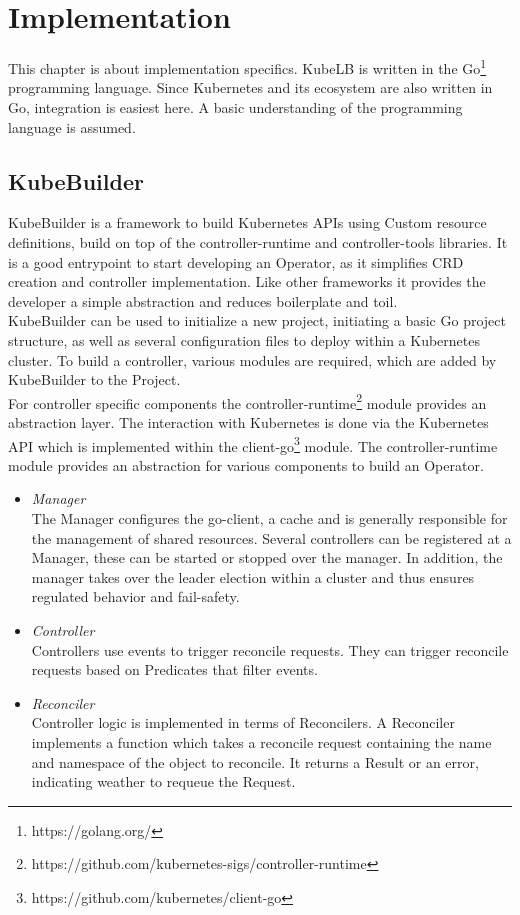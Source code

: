 \chapter{Implementation}

This chapter is about implementation specifics.
KubeLB is written in the Go\footnote{https://golang.org/} programming language.
Since Kubernetes and its ecosystem are also written in Go, integration is easiest here.
A basic understanding of the programming language is assumed.

\section{KubeBuilder}

KubeBuilder is a framework to build Kubernetes APIs using Custom resource definitions, build on top of the controller-runtime and controller-tools libraries.
It is a good entrypoint to start developing an Operator, as it simplifies CRD creation and controller implementation.
Like other frameworks it provides the developer a simple abstraction and reduces boilerplate and toil.
\\
KubeBuilder can be used to initialize a new project, initiating a basic Go project structure, as well as several configuration files to deploy within a Kubernetes cluster.
To build a controller, various modules are required, which are added by KubeBuilder to the Project.
\\
For controller specific components the controller-runtime\footnote{https://github.com/kubernetes-sigs/controller-runtime} module provides an abstraction layer.
The interaction with Kubernetes is done via the Kubernetes API which is implemented within the client-go\footnote{https://github.com/kubernetes/client-go} module.
The controller-runtime module provides an abstraction for various components to build an Operator.

\begin{itemize}
    \item \textit{Manager} \\
    The Manager configures the go-client, a cache and is generally responsible for the management of shared resources.
    Several controllers can be registered at a Manager, these can be started or stopped over the manager.
    In addition, the manager takes over the leader election within a cluster and thus ensures regulated behavior and fail-safety.
    \item \textit{Controller} \\
    Controllers use events to trigger reconcile requests.
    They can trigger reconcile requests based on Predicates that filter events.
    \item \textit{Reconciler} \\
    Controller logic is implemented in terms of Reconcilers.
    A Reconciler implements a function which takes a reconcile request containing the name and namespace of the object to reconcile.
    It returns a Result or an error, indicating weather to requeue the Request.
\end{itemize}


